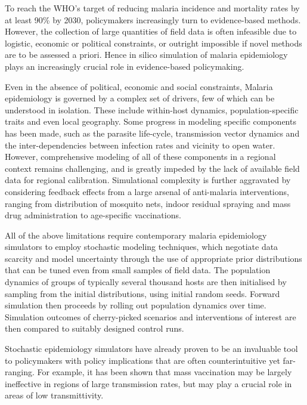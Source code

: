 \documentclass{article}
\begin{document}
To reach the WHO’s target of reducing malaria incidence and mortality rates by at least 90\% by 2030, policymakers increasingly turn to evidence-based methods. However, the collection of large quantities of field data is often infeasible due to logistic, economic or political constraints, or outright impossible if novel methods are to be assessed a priori. Hence in silico simulation of malaria epidemiology plays an increasingly crucial role in evidence-based policymaking.

Even in the absence of political, economic and social constraints, Malaria epidemiology is governed by a complex set of drivers, few of which can be understood in isolation. These include within-host dynamics, population-specific traits and even local geography. Some progress in modeling specific components has been made, such as the parasite life-cycle, transmission vector dynamics and the inter-dependencies between infection rates and vicinity to open water. However, comprehensive modeling of all of these components in a regional context remains challenging, and is greatly impeded by the lack of available field data for regional calibration. Simulational complexity is further aggravated by considering feedback effects from a large arsenal of anti-malaria interventions, ranging from distribution of mosquito nets, indoor residual spraying and mass drug administration to age-specific vaccinations. 

All of the above limitations require contemporary malaria epidemiology simulators to employ stochastic modeling techniques, which negotiate data scarcity and model uncertainty through the use of appropriate prior distributions that can be tuned even from small samples of field data. The population dynamics of groups of typically several thousand hosts are then initialised by sampling from the initial distributions, using initial random seeds. Forward simulation then proceeds by rolling out population dynamics over time. Simulation outcomes of cherry-picked scenarios and interventions of interest are then compared to suitably designed control runs.

Stochastic epidemiology simulators have already proven to be an invaluable tool to policymakers with policy implications that are often counterintuitive yet far-ranging. For example, it has been shown that mass vaccination may be largely ineffective in regions of large transmission rates, but may play a crucial role in areas of low transmittivity. 
\end{document}
